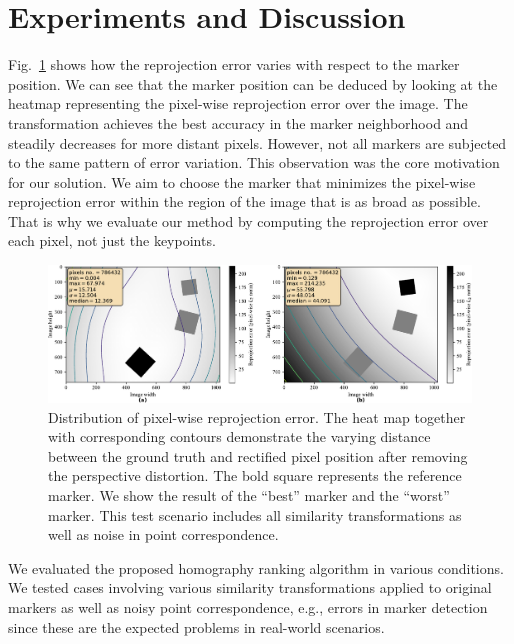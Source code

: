 \section{Experiments and Discussion}
\label{sec:HomographyExperiments}

Fig.~\ref{fig:HeatmapsBestWorst} shows how the reprojection error varies with respect to the marker position. We can see that the marker position can be deduced by looking at the heatmap representing the pixel-wise reprojection error over the image. The transformation achieves the best accuracy in the marker neighborhood and steadily decreases for more distant pixels. However, not all markers are subjected to the same pattern of error variation. This observation was the core motivation for our solution. We aim to choose the marker that minimizes the pixel-wise reprojection error within the region of the image that is as broad as possible. That is why we evaluate our method by computing the reprojection error over each pixel, not just the keypoints.

\begin{figure}[t]
    \centerline{\includegraphics[width=\linewidth]{figures/homography/heatmaps_best_worst.pdf}}
    \caption[Homography ranking heatmaps]{Distribution of pixel-wise reprojection error. The heat map together with corresponding contours demonstrate the varying distance between the ground truth and rectified pixel position after removing the perspective distortion. The bold square represents the reference marker. We show the result of  the ``best'' marker and  the ``worst'' marker. This test scenario includes all similarity transformations as well as noise in point correspondence.}
    \label{fig:HeatmapsBestWorst}
\end{figure}

We evaluated the proposed homography ranking algorithm in various conditions. We tested cases involving various similarity transformations applied to original markers as well as noisy point correspondence, e.g., errors in marker detection since these are the expected problems in real-world scenarios.


